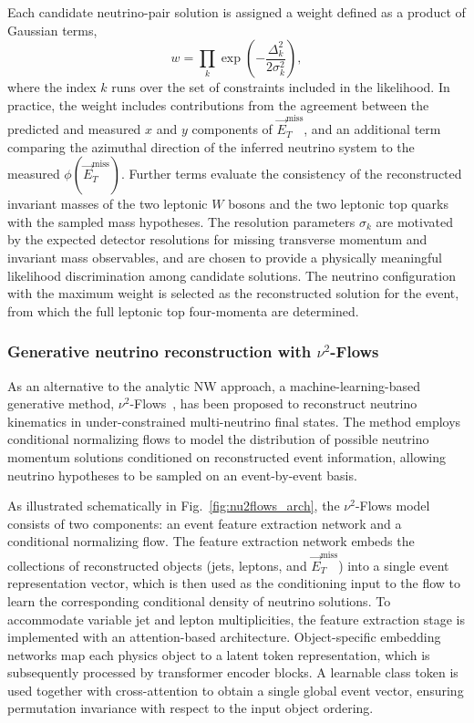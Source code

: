 Each candidate neutrino-pair solution is assigned a weight defined as a product of Gaussian terms,
%
\[
w=\prod_k \exp\!\left(-\frac{\Delta_k^2}{2\sigma_k^2}\right),
\]
%
where the index $k$ runs over the set of constraints included in the likelihood. 
In practice, the weight includes contributions from the agreement between the predicted and measured $x$ and $y$ components of $\vec{E}_T^{\mathrm{miss}}$, and an additional term comparing the azimuthal direction of the inferred neutrino system to the measured $\phi(\vec{E}_T^{\mathrm{miss}})$. 
Further terms evaluate the consistency of the reconstructed invariant masses of the two leptonic $W$ bosons and the two leptonic top quarks with the sampled mass hypotheses. 
The resolution parameters $\sigma_k$ are motivated by the expected detector resolutions for missing transverse momentum and invariant mass observables, and are chosen to provide a physically meaningful likelihood discrimination among candidate solutions.
The neutrino configuration with the maximum weight is selected as the reconstructed solution for the event, from which the full leptonic top four-momenta are determined.

\subsubsection{Generative neutrino reconstruction with \texorpdfstring{$\nu^2$}{nu2}-Flows}

As an alternative to the analytic NW approach, a machine-learning-based generative method, $\nu^2$-Flows~\cite{Raine2023nu2flows}, has been proposed to reconstruct neutrino kinematics in under-constrained multi-neutrino final states.
The method employs conditional normalizing flows to model the distribution of possible neutrino momentum solutions conditioned on reconstructed event information, allowing neutrino hypotheses to be sampled on an event-by-event basis.

As illustrated schematically in Fig.~\ref{fig:nu2flows_arch}, the $\nu^2$-Flows model consists of two components: an event feature extraction network and a conditional normalizing flow.
The feature extraction network embeds the collections of reconstructed objects (jets, leptons, and $\vec{E}_T^{\mathrm{miss}}$) into a single event representation vector, which is then used as the conditioning input to the flow to learn the corresponding conditional density of neutrino solutions.
To accommodate variable jet and lepton multiplicities, the feature extraction stage is implemented with an attention-based architecture.
Object-specific embedding networks map each physics object to a latent token representation, which is subsequently processed by transformer encoder blocks.
A learnable class token is used together with cross-attention to obtain a single global event vector, ensuring permutation invariance with respect to the input object ordering.

